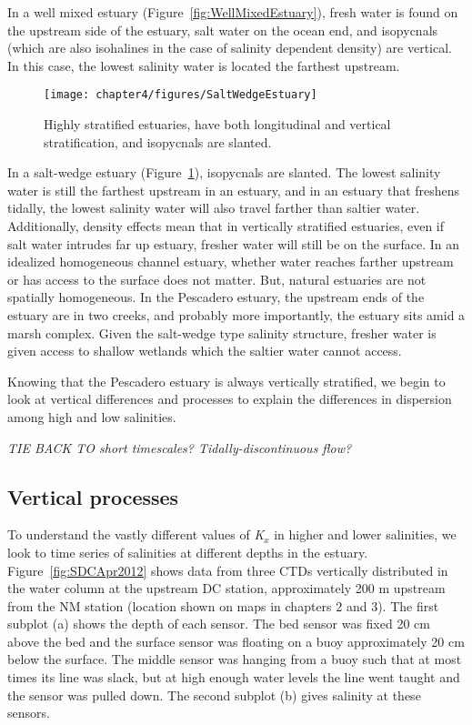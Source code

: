 In a well mixed estuary (Figure~\ref{fig:WellMixedEstuary}), fresh water is found on the upstream side of the estuary, salt water on the ocean end, and isopycnals (which are also isohalines in the case of salinity dependent density) are vertical. In this case, the lowest salinity water is located the farthest upstream. 

\begin{figure}[h]
\centering
	\texttt{[image: chapter4/figures/SaltWedgeEstuary]}
	\caption{Highly stratified estuaries, have both longitudinal and vertical stratification, and isopycnals are slanted.} \label{fig:SaltWedgeEstuary}
\end{figure}

In a salt-wedge estuary (Figure~\ref{fig:SaltWedgeEstuary}), isopycnals are slanted. The lowest salinity water is still the farthest upstream in an estuary, and in an estuary that freshens tidally, the lowest salinity water will also travel farther than saltier water. Additionally, density effects mean that in vertically stratified estuaries, even if salt water intrudes far up estuary, fresher water will still be on the surface. In an idealized homogeneous channel estuary, whether water reaches farther upstream or has access to the surface does not matter. But, natural estuaries are not spatially homogeneous. In the Pescadero estuary, the upstream ends of the estuary are in two creeks, and probably more importantly, the estuary sits amid a marsh complex. Given the salt-wedge type salinity structure, fresher water is given access to shallow wetlands which the saltier water cannot access. 

Knowing that the Pescadero estuary is always vertically stratified, we begin to look at vertical differences and processes to explain the differences in dispersion among high and low salinities. 

\emph{TIE BACK TO short timescales? Tidally-discontinuous flow?}

\subsection{Vertical processes}

To understand the vastly different values of \emph{K$_x$} in higher and lower salinities, we look to time series of salinities at different depths in the estuary. Figure~\ref{fig:SDCApr2012} shows data from three CTDs vertically distributed in the water column at the upstream DC station, approximately 200 m upstream from the NM station (location shown on maps in chapters 2 and 3). The first subplot (a) shows the depth of each sensor. The bed sensor was fixed 20 cm above the bed and the surface sensor was floating on a buoy approximately 20 cm below the surface. The middle sensor was hanging from a buoy such that at most times its line was slack, but at high enough water levels the line went taught and the sensor was pulled down. The second subplot (b) gives salinity at these sensors.

